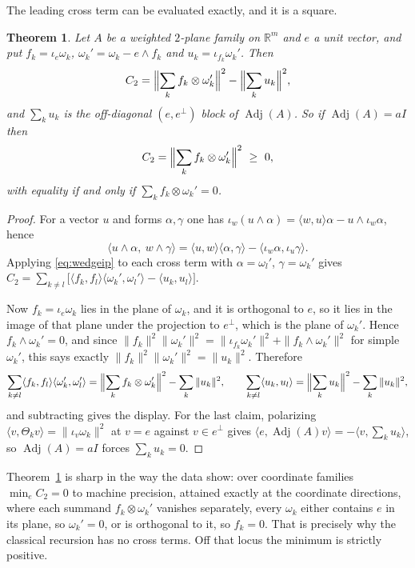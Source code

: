 \documentclass[11pt]{article}
\newtheorem{theorem}{Theorem}
\theoremstyle{remark}
\begin{document}
The leading cross term can be evaluated exactly, and it is a square.

\begin{theorem}\label{thm:C2}
Let $A$ be a weighted $2$-plane family on $\mathbb R^m$ and $e$ a unit vector, and put
$f_k=\iota_e\omega_k$, $\omega_k'=\omega_k-e\wedge f_k$ and $u_k=\iota_{f_k}\omega_k'$.
Then
\[
C_2=\Bigl\|\sum_kf_k\otimes\omega_k'\Bigr\|^2-\Bigl\|\sum_ku_k\Bigr\|^2 ,
\]
and $\sum_ku_k$ is the off-diagonal $(e,e^\perp)$ block of $\operatorname{Adj}(A)$. So if
$\operatorname{Adj}(A)=aI$ then
\[
C_2=\Bigl\|\sum_kf_k\otimes\omega_k'\Bigr\|^2\ \ge\ 0,
\]
with equality if and only if $\sum_kf_k\otimes\omega_k'=0$.
\end{theorem}

\begin{proof}
For a vector $u$ and forms $\alpha,\gamma$ one has
$\iota_w(u\wedge\alpha)=\langle w,u\rangle\alpha-u\wedge\iota_w\alpha$, hence
\begin{equation}\label{eq:wedgeip}
\langle u\wedge\alpha,\ w\wedge\gamma\rangle
=\langle u,w\rangle\langle\alpha,\gamma\rangle-\langle\iota_w\alpha,\iota_u\gamma\rangle .
\end{equation}
Applying \eqref{eq:wedgeip} to each cross term with $\alpha=\omega_l'$,
$\gamma=\omega_k'$ gives
$C_2=\sum_{k\ne l}\bigl[\langle f_k,f_l\rangle\langle\omega_k',\omega_l'\rangle
-\langle u_k,u_l\rangle\bigr]$.

Now $f_k=\iota_e\omega_k$ lies in the plane of $\omega_k$, and it is orthogonal to $e$,
so it lies in the image of that plane under the projection to $e^\perp$, which is the
plane of $\omega_k'$. Hence $f_k\wedge\omega_k'=0$, and since
$\|f_k\|^2\|\omega_k'\|^2=\|\iota_{f_k}\omega_k'\|^2+\|f_k\wedge\omega_k'\|^2$ for simple
$\omega_k'$, this says exactly
$\|f_k\|^2\|\omega_k'\|^2=\|u_k\|^2$. Therefore
\[
\sum_{k\ne l}\langle f_k,f_l\rangle\langle\omega_k',\omega_l'\rangle
=\Bigl\|\sum_kf_k\otimes\omega_k'\Bigr\|^2-\sum_k\|u_k\|^2,
\qquad
\sum_{k\ne l}\langle u_k,u_l\rangle=\Bigl\|\sum_ku_k\Bigr\|^2-\sum_k\|u_k\|^2,
\]
and subtracting gives the display. For the last claim, polarizing
$\langle v,\Theta_kv\rangle=\|\iota_v\omega_k\|^2$ at $v=e$ against $v\in e^\perp$ gives
$\langle e,\operatorname{Adj}(A)v\rangle=-\langle v,\sum_k u_k\rangle$, so
$\operatorname{Adj}(A)=aI$ forces $\sum_ku_k=0$.
\end{proof}

Theorem~\ref{thm:C2} is sharp in the way the data show: over coordinate families
$\min_eC_2=0$ to machine precision, attained exactly at the coordinate directions, where
each summand $f_k\otimes\omega_k'$ vanishes separately, every $\omega_k$ either
contains $e$ in its plane, so $\omega_k'=0$, or is orthogonal to it, so $f_k=0$. That is
precisely why the classical recursion has no cross terms. Off that locus the minimum is
strictly positive.
\end{document}
